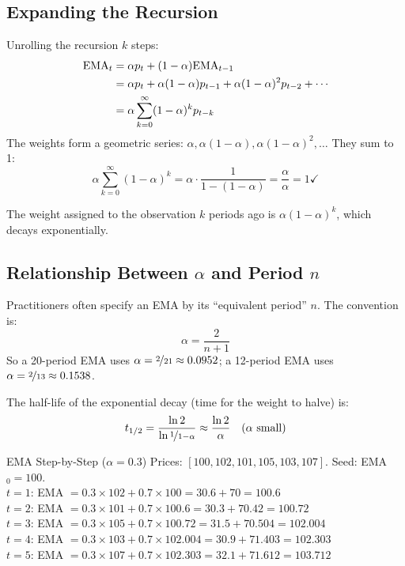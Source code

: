 \documentclass[12pt,a4paper,openany]{report}
\theoremstyle{definition}
\begin{document}
\subsection{Expanding the Recursion}

Unrolling the recursion $k$ steps:
\begin{align}
  \text{EMA}_t &= \alpha p_t + (1-\alpha)\text{EMA}_{t-1} \notag \\
               &= \alpha p_t + \alpha(1-\alpha)p_{t-1} + \alpha(1-\alpha)^2 p_{t-2} + \cdots \notag \\
               &= \alpha \sum_{k=0}^{\infty} (1-\alpha)^k p_{t-k}
\end{align}
The weights form a geometric series: $\alpha, \alpha(1-\alpha), \alpha(1-\alpha)^2, \ldots$ They sum to 1:
\[
  \alpha \sum_{k=0}^{\infty} (1-\alpha)^k = \alpha \cdot \frac{1}{1-(1-\alpha)} = \frac{\alpha}{\alpha} = 1 \checkmark
\]

The weight assigned to the observation $k$ periods ago is $\alpha(1-\alpha)^k$, which decays exponentially.

\subsection{Relationship Between \texorpdfstring{$\alpha$}{alpha} and Period $n$}

Practitioners often specify an EMA by its ``equivalent period'' $n$. The convention is:
\begin{equation}
  \alpha = \frac{2}{n+1}
\end{equation}
So a 20-period EMA uses $\alpha = \nicefrac{2}{21} \approx 0.0952$; a 12-period EMA uses $\alpha = \nicefrac{2}{13} \approx 0.1538$.

The half-life of the exponential decay (time for the weight to halve) is:
\begin{equation}
  t_{1/2} = \frac{\ln 2}{\ln\nicefrac{1}{1-\alpha}} \approx \frac{\ln 2}{\alpha} \quad (\alpha \text{ small})
\end{equation}

\begin{examplebox}{EMA Step-by-Step ($\alpha = 0.3$)}
Prices: $[100, 102, 101, 105, 103, 107]$. Seed: EMA$_0 = 100$. \\
$t=1$: EMA $= 0.3 \times 102 + 0.7 \times 100 = 30.6 + 70 = 100.6$ \\
$t=2$: EMA $= 0.3 \times 101 + 0.7 \times 100.6 = 30.3 + 70.42 = 100.72$ \\
$t=3$: EMA $= 0.3 \times 105 + 0.7 \times 100.72 = 31.5 + 70.504 = 102.004$ \\
$t=4$: EMA $= 0.3 \times 103 + 0.7 \times 102.004 = 30.9 + 71.403 = 102.303$ \\
$t=5$: EMA $= 0.3 \times 107 + 0.7 \times 102.303 = 32.1 + 71.612 = 103.712$
\end{examplebox}
\end{document}

